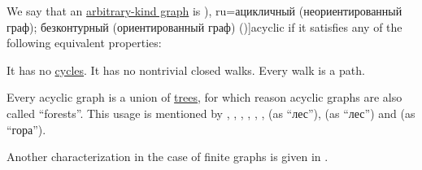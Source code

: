 \begin{definition}\label{def:acyclic_graph}
  We say that an \hyperref[rem:arbitrary_kind_graph]{arbitrary-kind graph} is \term[bg=ацикличен (ориентиран граф) (\cite[14]{Мирчев2001Графи}), ru=ацикличный (неориентированный граф); безконтурный (ориентированный граф) (\cite[280]{БелоусовТкачёв2004ДискретнаяМатематика})]{acyclic} if it satisfies any of the following equivalent properties:
  \begin{thmenum}
     It has no \hyperref[def:graph_cycle]{cycles}.
     It has no nontrivial closed walks.
     Every walk is a path.
  \end{thmenum}
\end{definition}
\begin{comments}
  \item Every acyclic graph is a union of \hyperref[def:tree]{trees}, for which reason acyclic graphs are also called \enquote{forests}. This usage is mentioned by , , , , , ,  (as \enquote{лес}),  (as \enquote{лес}) and  (as \enquote{гора}).

  \item Another characterization in the case of finite graphs is given in .
\end{comments}
